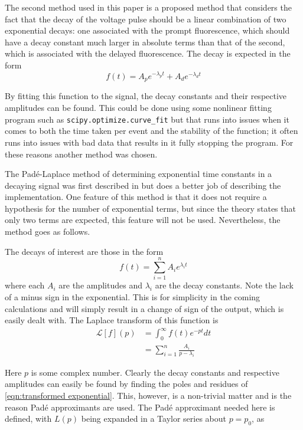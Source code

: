 \documentclass[11pt]{article}
\numberwithin{equation}{section}
\numberwithin{figure}{section}
\numberwithin{table}{section}
\begin{document}
\par The second method used in this paper is a proposed method that considers the fact that the decay of the voltage pulse should be a linear combination of two exponential decays: one associated with the prompt fluorescence, which should have a decay constant much larger in absolute terms than that of the second, which is associated with the delayed fluorescence. The decay is expected in the form
\begin{equation}
    f(t)=A_pe^{-\lambda_pt}+A_de^{-\lambda_dt}
    \label{eqn:linear exponential combination}
\end{equation}
\par By fitting this function to the signal, the decay constants and their respective amplitudes can be found. This could be done using some nonlinear fitting program such as \texttt{scipy.optimize.curve\_fit} but that runs into issues when it comes to both the time taken per event and the stability of the function; it often runs into issues with bad data that results in it fully stopping the program. For these reasons another method was chosen. 
\newline
\par The Pad\'e-Laplace method of determining exponential time constants in a decaying signal was first described in \cite{Yeramian} but \cite{Hellen-Pade} does a better job of describing the implementation. One feature of this method is that it does not require a hypothesis for the number of exponential terms, but since the theory states that only two terms are expected, this feature will not be used. Nevertheless, the method goes as follows.
\par The decays of interest are those in the form
\begin{equation}
    f(t)=\sum_{i=1}^n A_i e^{\lambda_i t}
    \label{eqn:exponential decay sum}
\end{equation}
where each $A_i$ are the amplitudes and $\lambda_i$ are the decay constants. Note the lack of a minus sign in the exponential. This is for simplicity in the coming calculations and will simply result in a change of sign of the output, which is easily dealt with. The Laplace transform of this function is 
\begin{align}
    \mathcal{L}[f](p)&=\int_0^\infty f(t)e^{-pt}dt\label{eqn:laplace transform}\\
    &=\sum_{i=1}^n\frac{A_i}{p-\lambda_i}\label{eqn:transformed exponential}
\end{align}
\par Here $p$ is some complex number. Clearly the decay constants and respective amplitudes can easily be found by finding the poles and residues of \cref{eqn:transformed exponential}. This, however, is a non-trivial matter and is the reason Pad\'e approximants are used. The Pad\'e approximant needed here is defined, with $L(p)$ being expanded in a Taylor series about $p=p_0$, as
\end{document}
